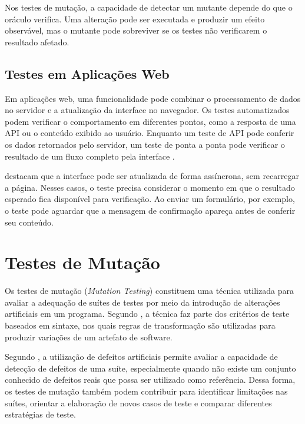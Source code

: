 Nos testes de mutação, a capacidade de detectar um mutante depende do que o oráculo verifica. Uma alteração pode ser executada e produzir um efeito observável, mas o mutante pode sobreviver se os testes não verificarem o resultado afetado.

\subsection{Testes em Aplicações Web}
\label{subsec:testes-web}

Em aplicações web, uma funcionalidade pode combinar o processamento de dados no servidor e a atualização da interface no navegador. Os testes automatizados podem verificar o comportamento em diferentes pontos, como a resposta de uma API ou o conteúdo exibido ao usuário. Enquanto um teste de API pode conferir os dados retornados pelo servidor, um teste de ponta a ponta pode verificar o resultado de um fluxo completo pela interface \cite{li2014webtesting}.

 destacam que a interface pode ser atualizada de forma assíncrona, sem recarregar a página. Nesses casos, o teste precisa considerar o momento em que o resultado esperado fica disponível para verificação. Ao enviar um formulário, por exemplo, o teste pode aguardar que a mensagem de confirmação apareça antes de conferir seu conteúdo.

\section{Testes de Mutação}
\label{subsec:testes-mutacao}

Os testes de mutação (\textit{Mutation Testing}) constituem uma técnica utilizada para avaliar a adequação de suítes de testes por meio da introdução de alterações artificiais em um programa. Segundo , a técnica faz parte dos critérios de teste baseados em sintaxe, nos quais regras de transformação são utilizadas para produzir variações de um artefato de software.

Segundo , a utilização de defeitos artificiais permite avaliar a capacidade de detecção de defeitos de uma suíte, especialmente quando não existe um conjunto conhecido de defeitos reais que possa ser utilizado como referência. Dessa forma, os testes de mutação também podem contribuir para identificar limitações nas suítes, orientar a elaboração de novos casos de teste e comparar diferentes estratégias de teste.

